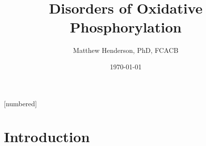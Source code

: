 \documentclass[presentation, smaller]{beamer}
\author{Matthew Henderson, PhD, FCACB}
\date{\today}
\title{Disorders of Oxidative Phosphorylation}
\institute[NSO]{Newborn Screening Ontario | The University of Ottawa}
\begin{document}
\maketitle


\vspace{220pt}
\beamertemplatenavigationsymbolsempty
{}[numbered]

\section{Introduction}
\label{sec:orgdb503a6}
\end{document}
